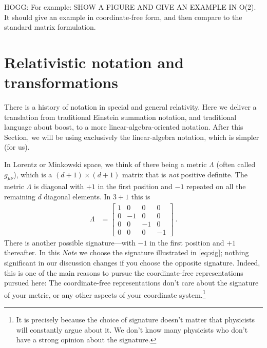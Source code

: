 \documentclass{article}
\newcommand{\plus}{\!+\!} %
\newcommand{\documentname}{\textsl{Note}}
\begin{document}
HOGG: For example: SHOW A FIGURE AND GIVE AN EXAMPLE IN O(2).
It should give an example in coordinate-free form, and then compare
to the standard matrix formulation.

\section{Relativistic notation and transformations}\label{sec:notation}

There is a history of notation in special and general relativity.
Here we deliver a translation from traditional Einstein summation notation, and traditional language about boost, to a more linear-algebra-oriented notation.
After this Section, we will be using exclusively the linear-algebra notation, which is simpler (for us).

In Lorentz or Minkowski space, we think of there being a metric $\Lambda$ (often called $g_{\mu\nu}$), which is a $(d\plus1)\times(d\plus1)$ matrix that is \emph{not} positive definite.
The metric $\Lambda$ is diagonal with $+1$ in the first position and $-1$ repeated on all the remaining $d$ diagonal elements.
In $3\plus1$ this is
\begin{align}\label{eq:sig}
    \Lambda &= \begin{bmatrix}1 & 0 & 0 & 0\\
                              0 & -1 & 0 & 0\\
                              0 & 0 & -1 & 0\\
                              0 & 0 & 0 & -1\end{bmatrix} ~.
\end{align}
There is another possible signature---with $-1$ in the first position and $+1$ thereafter.
In this \documentname{} we choose the signature illustrated in \eqref{eq:sig}; nothing significant in our discussion changes if you choose the opposite signature.
Indeed, this is one of the main reasons to pursue the coordinate-free representations pursued here:
The coordinate-free representations don't care about the signature of your metric, or any other aspects of your coordinate system.\footnote{It is precisely because the choice of signature doesn't matter that physicists will constantly argue about it. We don't know many physicists who don't have a strong opinion about the signature.}
\end{document}
